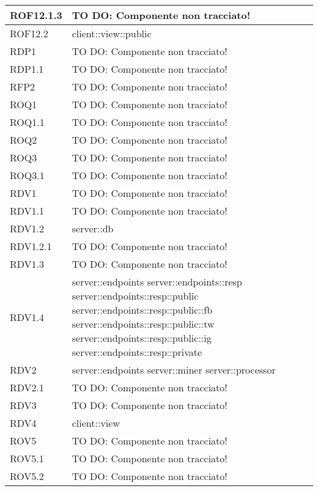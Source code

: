 \begin{center}
\begin{longtable}{| p{4cm} | p{8cm} |}
\hline
ROF12.1.3 & TO DO: Componente non tracciato! \\
\hline
ROF12.2 & client::view::public \\
\hline
RDP1 & TO DO: Componente non tracciato! \\
\hline
RDP1.1 & TO DO: Componente non tracciato! \\
\hline
RFP2 & TO DO: Componente non tracciato! \\
\hline
ROQ1 & TO DO: Componente non tracciato! \\
\hline
ROQ1.1 & TO DO: Componente non tracciato! \\
\hline
ROQ2 & TO DO: Componente non tracciato! \\
\hline
ROQ3 & TO DO: Componente non tracciato! \\
\hline
ROQ3.1 & TO DO: Componente non tracciato! \\
\hline
RDV1 & TO DO: Componente non tracciato! \\
\hline
RDV1.1 & TO DO: Componente non tracciato! \\
\hline
RDV1.2 & server::db \\
\hline
RDV1.2.1 & TO DO: Componente non tracciato! \\
\hline
RDV1.3 & TO DO: Componente non tracciato! \\
\hline
RDV1.4 & server::endpoints \newline server::endpoints::resp \newline server::endpoints::resp::public \newline server::endpoints::resp::public::fb \newline server::endpoints::resp::public::tw \newline server::endpoints::resp::public::ig \newline server::endpoints::resp::private \\
\hline
RDV2 & server::endpoints \newline server::miner \newline server::processor \\
\hline
RDV2.1 & TO DO: Componente non tracciato! \\
\hline
RDV3 & TO DO: Componente non tracciato! \\
\hline
RDV4 & client::view \\
\hline
ROV5 & TO DO: Componente non tracciato! \\
\hline
ROV5.1 & TO DO: Componente non tracciato! \\
\hline
ROV5.2 & TO DO: Componente non tracciato! \\

\end{longtable}
\end{center}
